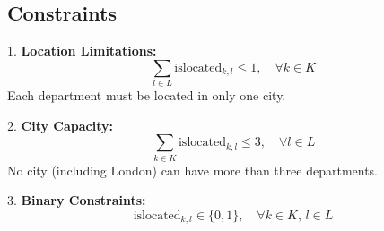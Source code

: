 \documentclass{article}
\begin{document}
\subsection*{Constraints}

1. \textbf{Location Limitations:}
   \[
   \sum_{l \in L} \text{islocated}_{k,l} \leq 1, \quad \forall k \in K
   \]
   Each department must be located in only one city.

2. \textbf{City Capacity:}
   \[
   \sum_{k \in K} \text{islocated}_{k,l} \leq 3, \quad \forall l \in L
   \]
   No city (including London) can have more than three departments.

3. \textbf{Binary Constraints:}
   \[
   \text{islocated}_{k,l} \in \{0, 1\}, \quad \forall k \in K, \, l \in L
   \]
\end{document}
